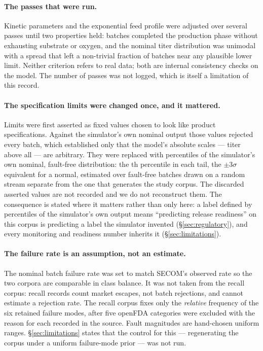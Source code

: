 \documentclass[11pt]{article}
\newcommand{\corpusreal}{SECOM}
\begin{document}
\paragraph{The passes that were run.} Kinetic parameters and the exponential feed
profile were adjusted over several passes until two properties held: batches
completed the production phase without exhausting substrate or oxygen, and the
nominal titer distribution was unimodal with a spread that left a non-trivial
fraction of batches near any plausible lower limit. Neither criterion refers to
real data; both are internal consistency checks on the model. The number of
passes was not logged, which is itself a limitation of this record.

\paragraph{The specification limits were changed once, and it mattered.} Limits
were first asserted as fixed values chosen to look like product specifications.
Against the simulator's own nominal output those values rejected every batch,
which established only that the model's absolute scales --- titer above all ---
are arbitrary. They were replaced with percentiles of the simulator's own
nominal, fault-free distribution: the \simSpecPercentile{}th percentile in each
tail, the $\pm 3\sigma$ equivalent for a normal, estimated over
\simSpecCalBatches{} fault-free batches drawn on a random stream separate from
the one that generates the study corpus. The discarded asserted values are not
recorded and we do not reconstruct them. The consequence is stated where it
matters rather than only here: a label defined by percentiles of the simulator's
own output means ``predicting release readiness'' on this corpus is predicting a
label the simulator invented (\S\ref{sec:regulatory}), and every monitoring and
readiness number inherits it (\S\ref{sec:limitations}).

\paragraph{The failure rate is an assumption, not an estimate.} The nominal batch
failure rate was set to match \corpusreal{}'s observed rate so the two corpora
are comparable in class balance. It was not taken from the recall corpus: recall
records count market escapes, not batch rejections, and cannot estimate a
rejection rate. The recall corpus fixes only the \emph{relative} frequency of the
six retained failure modes, after five openFDA categories were excluded with the
reason for each recorded in the source. Fault magnitudes are hand-chosen uniform
ranges. \S\ref{sec:limitations} states that the control for this --- regenerating
the corpus under a uniform failure-mode prior --- was not run.
\end{document}

